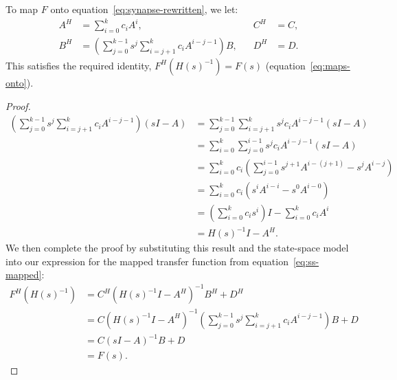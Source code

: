 \begin{theorem}
\label{thm:general-linear}
To map $F$ onto equation~\ref{eq:synapse-rewritten}, we let: %
\begin{equation} \label{eq:general-linear}
\begin{aligned}
A^H &= \sum_{i=0}^k c_i A^i \text{,} & \quad C^H &= C \text{,} \\
B^H &= \left( \sum_{j=0}^{k-1} s^j \sum_{i=j+1}^k c_i A^{i-j-1} \right) B \text{,} & \quad D^H &= D \text{.}
\end{aligned}
\end{equation}
This satisfies the required identity, $F^{H}(H(s)^{-1}) = F(s)$ (equation~\ref{eq:maps-onto}).
\end{theorem}

\begin{proof}
\begin{align*}
\left( \sum_{j=0}^{k-1} s^j \sum_{i=j+1}^k c_i A^{i-j-1} \right) (sI - A)  &= \sum_{j=0}^{k-1} \sum_{i=j+1}^k s^j c_i A^{i-j-1} (sI - A) \\
&= \sum_{i=0}^{k} \sum_{j=0}^{i-1} s^j c_i A^{i-j-1} (sI - A)  \\
&= \sum_{i=0}^k c_i \left( \sum_{j=0}^{i-1} s^{j+1} A^{i - (j + 1)} - s^j A^{i - j} \right) \\
&= \sum_{i=0}^k c_i \left( s^i A^{i - i} - s^0 A^{i-0} \right) \\
&= \left( \sum_{i=0}^k c_i s^i \right) I - \sum_{i=0}^k c_i A^i \\
&= H(s)^{-1}I - A^H \text{.}
\end{align*}
We then complete the proof by substituting this result and the state-space model into our expression for the mapped transfer function from equation~\ref{eq:ss-mapped}:
\begin{align*}
F^H(H(s)^{-1}) &= C^H(H(s)^{-1}I - A^H)^{-1} B^H + D^H \\
&= C(H(s)^{-1}I - A^H)^{-1} \left( \sum_{j=0}^{k-1} s^j \sum_{i=j+1}^k c_i A^{i-j-1} \right) B + D \\
&= C(sI - A)^{-1} B + D \\
&= F(s) \text{.}
\end{align*}
\end{proof}

